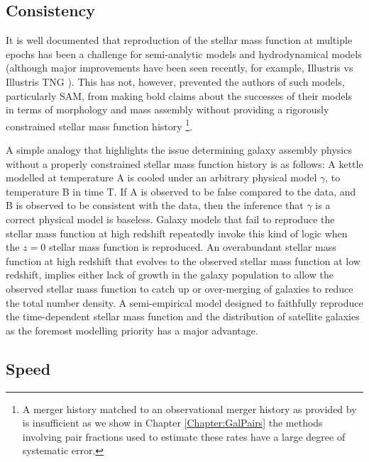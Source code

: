 \subsection{Consistency}
It is well documented that reproduction of the stellar mass function at multiple epochs has been a challenge for semi-analytic models \cite{Knebe2018CosmicModels, Asquith2018CosmicModels} and hydrodynamical models (although major improvements have been seen recently, for example, Illustris vs Illustris TNG \cite{Nelson2015TheRelease, Nelson2019TheRelease}). This has not, however, prevented the authors of such models, particularly SAM, from making bold claims about the successes of their models in terms of morphology and mass assembly without providing a rigorously constrained stellar mass function history \cite[e.g.][]{Somerville2008ANuclei, Hopkins2010MERGERSMATTER}\footnote{A merger history matched to an observational merger history as provided by \citet{Hopkins2010MERGERSMATTER} is insufficient as we show in Chapter \ref{Chapter:GalPairs} the methods involving pair fractions used to estimate these rates have a large degree of systematic error.}. 

A simple analogy that highlights the issue determining galaxy assembly physics without a properly constrained stellar mass function history is as follows: A kettle modelled at temperature A is cooled under an arbitrary physical model $\gamma$, to temperature B in time T. If A is observed to be false compared to the data, and B is observed to be consistent with the data, then the inference that $\gamma$ is a correct physical model is baseless. Galaxy models that fail to reproduce the stellar mass function at high redshift repeatedly invoke this kind of logic when the $z=0$ stellar mass function is reproduced. An overabundant stellar mass function at high redshift that evolves to the observed stellar mass function at low redshift, implies either lack of growth in the galaxy population to allow the observed stellar mass function to catch up or over-merging of galaxies to reduce the total number density. A semi-empirical model designed to faithfully reproduce the time-dependent stellar mass function and the distribution of satellite galaxies as the foremost modelling priority has a major advantage. 

\subsection{Speed}

